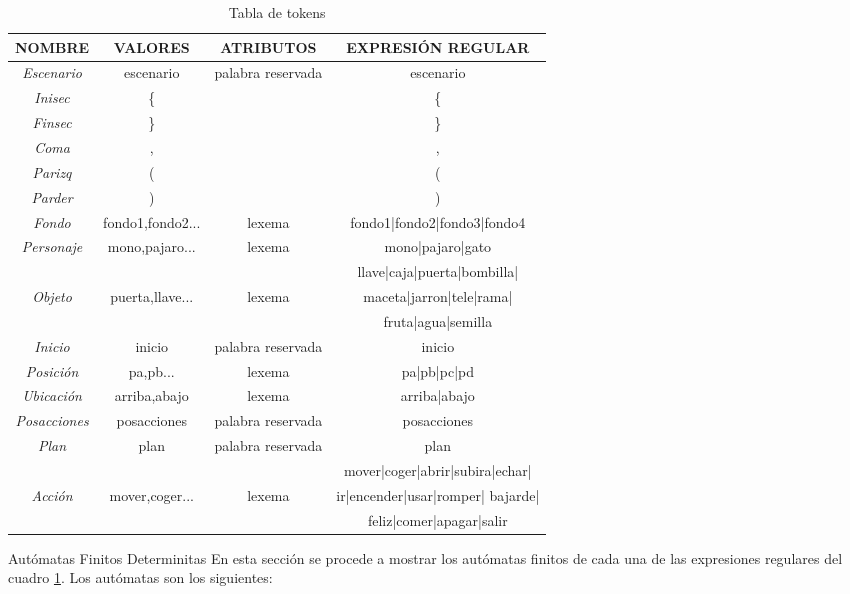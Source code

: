 \documentclass[11pt,a4paper,spanish,twoside]{book}
\makeatletter
\renewcommand{\section}{
  \@startsection{section}{1}{0mm}{\baselineskip}
  {2.5mm}{\Large\bf}
}
\theoremstyle{plain} \newtheorem{nota}{Nota}
\makeatother
\begin{document}
{\begin{sidewaystable}[!ht]
  \centering
  \begin{tabular}{|c|c|c|c|}
    \hline
     \textbf{NOMBRE} & \textbf{VALORES} & \textbf{ATRIBUTOS} & 
     \textbf{EXPRESIÓN REGULAR}\\\hline\hline
     \emph{Escenario} & escenario & palabra reservada & escenario\\\hline
     \emph{Inisec} & \{ & & \{\\\hline
     \emph{Finsec} & \} & & \}\\\hline
     \emph{Coma} & , & & ,\\\hline
     \emph{Parizq} & ( & & (\\\hline
     \emph{Parder} & ) & & )\\\hline
     \emph{Fondo} & fondo1,fondo2... & lexema & fondo1|fondo2|fondo3|fondo4\\
     \hline
     \emph{Personaje} & mono,pajaro... & lexema & mono|pajaro|gato\\\hline
     & & & llave|caja|puerta|bombilla|\\
     \emph{Objeto} & puerta,llave... & lexema & maceta|jarron|tele|rama|\\
     & & & fruta|agua|semilla\\\hline
     \emph{Inicio} & inicio & palabra reservada & inicio\\\hline
     \emph{Posición} & pa,pb... & lexema & pa|pb|pc|pd\\\hline
     \emph{Ubicación} & arriba,abajo & lexema & arriba|abajo\\\hline
     \emph{Posacciones} & posacciones & palabra reservada & posacciones\\\hline
     \emph{Plan} & plan & palabra reservada & plan\\\hline
     & & & mover|coger|abrir|subira|echar|\\
     \emph{Acción} & mover,coger... & lexema & ir|encender|usar|romper|
     bajarde|\\
     & & & feliz|comer|apagar|salir\\\hline
  \end{tabular}
  \caption{Tabla de tokens}\label{tokens}
\end{sidewaystable}

\section{Autómatas Finitos Determinitas}
En esta sección se procede a mostrar los autómatas finitos de cada una de las 
expresiones regulares del cuadro \ref{tokens}. Los autómatas son los siguientes:

}
\end{document}
